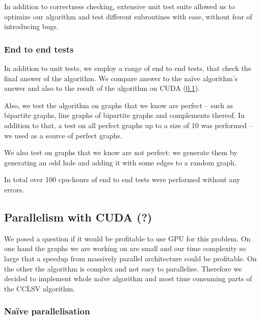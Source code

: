 In addition to correctness checking, extensive unit test suite allowed us to optimize our algorithm and test different subroutines with ease, without fear of introducing bugs.

\subsubsection{End to end tests}

In addition to unit tests, we employ a range of end to end tests, that check the final answer of the algorithm. We compare answer to the na\"ive algorithm's answer and also to the result of the algorithm on CUDA (\cref{sec:CUDA}).

Also, we test the algorithm on graphs that we know are perfect -- such as bipartite graphs, line graphs of bipartite graphs and complements thereof. In addition to that, a test on all perfect graphs up to a size of 10 was performed -- we used \cite{graphRepo} as a source of perfect graphs.

We also test on graphs that we know are not perfect: we generate them by generating an odd hole and adding it with some edges to a random graph.

In total over 100 cpu-hours of end to end tests were performed without any errors.

\subsection{Parallelism with CUDA (?)}
\label{sec:CUDA}


We posed a question if it would be profitable to use GPU for this problem. On one hand the graphs we are working on are small and our time complexity so large that a speedup from massively parallel architecture could be profitable. On the other the algorithm is complex and not easy to parallelise. Therefore we decided to implement whole na\"ive algorithm and most time consuming parts of the CCLSV algorithm.

\subsubsection{Na\"ive parallelisation}

